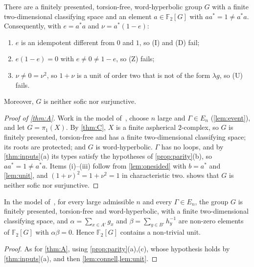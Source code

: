 \documentclass[11pt]{article}
\theoremstyle{definition}
\theoremstyle{plain}
\newcommand{\F}{\mathbb{F}}
\begin{document}
\begin{corollary}[the case $p=2$; $G$ and $a$ from~{\cite[Thm.~1.1 and Prop.~2.1]{OAI197a}}]\label{thm:A}
There are a finitely presented, torsion-free, word-hyperbolic group $G$ with a finite two-dimensional classifying space and an element $a\in\F_2[G]$ with $aa^*=1\neq a^*a$. Consequently, with $e=a^*a$ and $\nu=a^*(1-e)$:
\begin{enumerate}[label=\textup{(\roman*)},itemsep=0pt,topsep=2pt]
\item $e$ is an idempotent different from $0$ and $1$, so \textup{(I)} and \textup{(D)} fail;
\item $e(1-e)=0$ with $e\neq0\neq1-e$, so \textup{(Z)} fails;
\item $\nu\neq0=\nu^2$, so $1+\nu$ is a unit of order two that is not of the form $\lambda g$, so \textup{(U)} fails.
\end{enumerate}
Moreover, $G$ is neither sofic nor surjunctive.
\end{corollary}

\begin{proof}[Proof of \cref{thm:A}]
Work in the model of~\cite{OAI197a}, choose $n$ large and $\Gamma\in E_n$ (\cref{lem:event}), and let $G=\pi_1(X)$. By \cref{thm:C}, $X$ is a finite aspherical $2$-complex, so $G$ is finitely presented, torsion-free and has a finite two-dimensional classifying space; its roots are protected; and $G$ is word-hyperbolic. $\Gamma$ has no loops, and by \cref{thm:inputs}(a) its types satisfy the hypotheses of \cref{prop:parity}(b), so $aa^*=1\neq a^*a$. Items (i)--(iii) follow from \cref{lem:onesided} with $b=a^*$ and \cref{lem:unit}, and $(1+\nu)^2=1+\nu^2=1$ in characteristic two.  shows that $G$ is neither sofic nor surjunctive.
\end{proof}

\begin{corollary}\label{cor:zd}
In the model of~\cite{OAI196}, for every large admissible $n$ and every $\Gamma\in E_n$, the group $G$ is finitely presented, torsion-free and word-hyperbolic, with a finite two-dimensional classifying space, and $\alpha=\sum_{x\in A'}g_x$ and $\beta=\sum_{y\in B'}h_y^{-1}$ are non-zero elements of $\F_2[G]$ with $\alpha\beta=0$. Hence $\F_2[G]$ contains a non-trivial unit.
\end{corollary}

\begin{proof}
As for \cref{thm:A}, using \cref{prop:parity}(a),(c), whose hypothesis holds by \cref{thm:inputs}(a), and then \cref{lem:connell,lem:unit}.
\end{proof}
\end{document}
